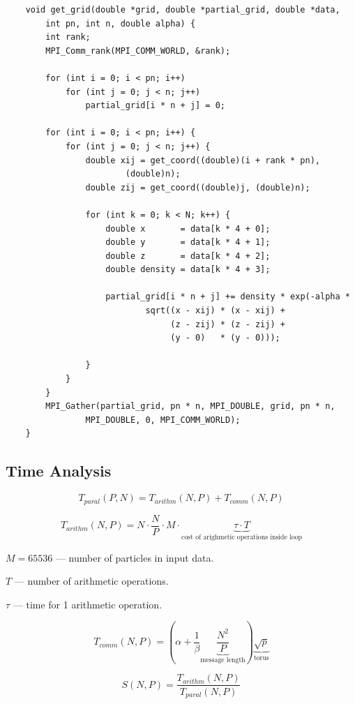 \documentclass[a4paper,12pt]{article}
\begin{document}
\begin{verbatim}
    void get_grid(double *grid, double *partial_grid, double *data,
        int pn, int n, double alpha) {
        int rank;
        MPI_Comm_rank(MPI_COMM_WORLD, &rank);
        
        for (int i = 0; i < pn; i++)
            for (int j = 0; j < n; j++)
                partial_grid[i * n + j] = 0;

        for (int i = 0; i < pn; i++) {
            for (int j = 0; j < n; j++) {
                double xij = get_coord((double)(i + rank * pn),
                        (double)n);
                double zij = get_coord((double)j, (double)n);

                for (int k = 0; k < N; k++) {
                    double x       = data[k * 4 + 0];
                    double y       = data[k * 4 + 1];
                    double z       = data[k * 4 + 2];
                    double density = data[k * 4 + 3];

                    partial_grid[i * n + j] += density * exp(-alpha *
                            sqrt((x - xij) * (x - xij) +
                                 (z - zij) * (z - zij) +
                                 (y - 0)   * (y - 0)));

                }
            }
        }
        MPI_Gather(partial_grid, pn * n, MPI_DOUBLE, grid, pn * n,
                MPI_DOUBLE, 0, MPI_COMM_WORLD);
    }
\end{verbatim}

\subsection{Time Analysis}

\[
    T_{paral}(P, N) = T_{arithm}(N, P) + T_{comm}(N, P)
\] 

\[
    T_{arithm}(N, P) =
     N \cdot \frac{N}{P} \cdot M \cdot
 \underbrace{\tau \cdot T}_{\text{cost of arighmetic operations inside loop}}
\] 

\(M = 65536\) --- number of particles in input data.

\(T\) --- number of arithmetic operations.

\(\tau\) --- time for 1 arithmetic operation.

\[
    T_{comm}(N, P) = \left( \alpha + \frac{1}{\beta}
        \underbrace{\frac{N^2}{P}}_{\text{message length}}
            \right) 
            \underbrace{\sqrt{p} }_{\text{torus}}
\] 

\[
    S(N, P) = \frac{T_{arithm}(N, P)}{T_{paral}(N, P)}
\] 
\end{document}

